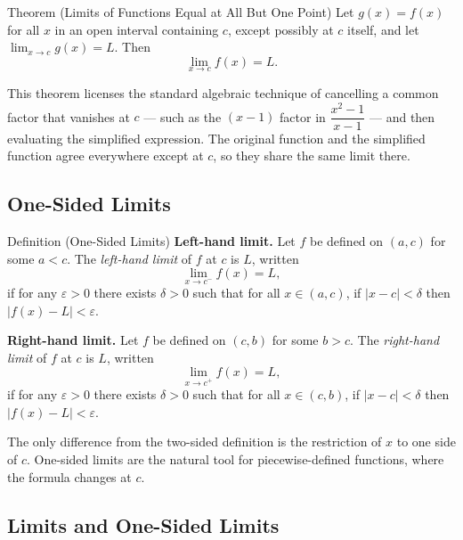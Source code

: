 \begin{theorembox}{Theorem (Limits of Functions Equal at All But One Point)}
Let $g(x) = f(x)$ for all $x$ in an open interval containing $c$,
except possibly at $c$ itself, and let $\lim_{x \to c} g(x) = L$.
Then
\[
  \lim_{x \to c} f(x) = L.
\]
\end{theorembox}

\begin{remark*}
This theorem licenses the standard algebraic technique of
cancelling a common factor that vanishes at $c$ --- such as
the $(x-1)$ factor in $\dfrac{x^2-1}{x-1}$ --- and then
evaluating the simplified expression.
The original function and the simplified function agree
everywhere except at $c$, so they share the same limit there.
\end{remark*}

\subsection*{One-Sided Limits}

\begin{propositionbox}{Definition (One-Sided Limits)}
\textbf{Left-hand limit.}
Let $f$ be defined on $(a, c)$ for some $a < c$.
The \emph{left-hand limit} of $f$ at $c$ is $L$, written
\[
  \lim_{x \to c^-} f(x) = L,
\]
if for any $\varepsilon > 0$ there exists $\delta > 0$ such that
for all $x \in (a, c)$, if $|x - c| < \delta$ then $|f(x) - L| < \varepsilon$.

\medskip
\textbf{Right-hand limit.}
Let $f$ be defined on $(c, b)$ for some $b > c$.
The \emph{right-hand limit} of $f$ at $c$ is $L$, written
\[
  \lim_{x \to c^+} f(x) = L,
\]
if for any $\varepsilon > 0$ there exists $\delta > 0$ such that
for all $x \in (c, b)$, if $|x - c| < \delta$ then $|f(x) - L| < \varepsilon$.
\end{propositionbox}

\begin{remark*}
The only difference from the two-sided definition is the
restriction of $x$ to one side of $c$.
One-sided limits are the natural tool for piecewise-defined
functions, where the formula changes at $c$.
\end{remark*}

\subsection*{Limits and One-Sided Limits}

